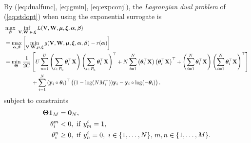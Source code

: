By (\ref{eq:dualfunc}, \ref{eq:gmin}, \ref{eq:expconj}), the \emph{Lagrangian dual problem} of (\ref{eq:stdopt}) when using the exponential surrogate is
\begin{equation*}
\begin{aligned}
&\max_{{\bm{\beta}}} \ \inf_{\mathbf{V}, \mathbf{W}, \bm{\mu}, \bm{\xi}} L(\mathbf{V}, \mathbf{W}, \bm{\mu}, \bm{\xi}, {\bm{\alpha}}, {\bm{\beta}}) \\
&= \max_{{\bm{\alpha}}, {\bm{\beta}}} \left[ \min_{\mathbf{V}, \mathbf{W}, \bm{\mu}, \bm{\xi}} g(\mathbf{V}, \mathbf{W}, \bm{\mu}, \bm{\xi}, {\bm{\alpha}}, {\bm{\beta}}) - r({\bm{\alpha}}) \right] \\
&= \min_{\mathbf{\Theta}} \, \frac{1}{2 C} \left[
     U \sum_{u=1}^U \left( \sum_{i \in P_u} \bm{\theta}_i^\top \mathbf{X} \right) \left( \sum_{i \in P_u} \bm{\theta}_i^\top \mathbf{X} \right)^\top
   + N \sum_{i=1}^N \left( \bm{\theta}_i^\top \mathbf{X} \right) \left( \bm{\theta}_i^\top \mathbf{X} \right)^\top
   + \left( \sum_{i=1}^N \bm{\theta}_i^\top \mathbf{X} \right) \left( \sum_{i=1}^N \bm{\theta}_i^\top \mathbf{X} \right)^\top \right] \\
& \hspace{5em}
   + \sum_{i=1}^N \left( \mathbf{y}_i \circ \bm{\theta}_i \right)^\top 
     \left( (1 - \log(N M_i^+)) \mathbf{y}_i - \mathbf{y}_i \circ \log(-\bm{\theta}_i) \right).
\end{aligned}
\end{equation*}
subject to constraints
\begin{equation*}
\begin{aligned}
\mathbf{\Theta} \mathbf{1}_M &= \mathbf{0}_N, \\
\theta_i^m & < 0, \ \mathrm{if} \ y_m^i = 1, \\
\theta_i^n & \ge 0, \ \mathrm{if} \ y_n^i = 0, \ i \in \{1,\dots,N\}, \, m,n \in \{1,\dots,M\}.
\end{aligned}
\end{equation*}


